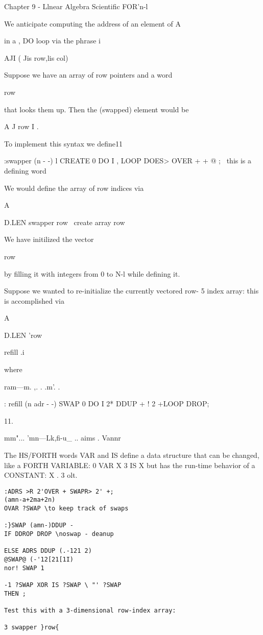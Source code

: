 {{{{Chapter 9 - Llnear Algebra Scientific FOR'n-l

We anticipate computing the address of an element of A{{ in a ,
DO loop via the phrase i

A{{JI}} ( Jis row,lis col)

Suppose we have an array of row pointers and a word }row{ that
looks them up. Then the (swapped) element would be

A{{ J }row{ I }}.

To implement this syntax we define11

:swapper (n - -) l
CREATE 0 DO I , LOOP
DOES> OVER + + @ ;
\ this is a defining word

 

 

We would define the array of row indices via

A{{ D.LEN swapper }row{ \ create array }row{

We have initilized the vector }row{ by filling it with integers
from 0 to N-l while defining it.

Suppose we wanted to re-initialize the currently vectored row- 5
index array: this is accomplished via

A{{ D.LEN '}row{ refill .i

where

ram—m. ,. . .m'. .

: refill (n adr - -)
SWAP 0 DO I 2* DDUP + !
2 +LOOP DROP;

 

11.

mm"... 'mn—Lk,fi-u\_ .. aims . Vannr

The HS/FORTH words VAR and IS define a data structure that can be changed, like a FORTH
VARIABLE: 0 VAR X 3 IS X but has the run-time behavior of a CONSTANT: X . 3 olt.



\begin{verbatim}
:ADRS >R 2'OVER + SWAPR> 2' +;
(amn-a+2ma+2n)
OVAR ?SWAP \to keep track of swaps

:}SWAP (amn-)DDUP -
IF DDROP DROP \noswap - deanup

ELSE ADRS DDUP (.-121 2)
@SWAP@ (-'12[21[1I)
nor! SWAP 1

-1 ?SWAP XOR IS ?SWAP \ "' ?SWAP
THEN ;

Test this with a 3-dimensional row-index array:

3 swapper }row{


\end{verbatim}}}}}}}}}}}
